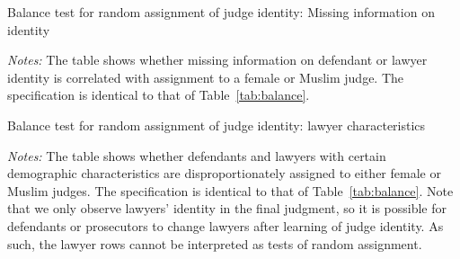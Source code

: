 \documentclass[12pt,english]{article}
\newcommand{\HOME}{\string~}
\newcommand{\curpath}{\HOME/ddl/justice-overleaf}
\newcommand{\curpath}{.}
\begin{document}
\begin{appendices}
\newpage


\begin{table}
   \begin{center}
    \caption{Balance test for random assignment of judge identity: Missing information on identity}
    \label{tab:bal_miss}
    \resizebox{1\linewidth}{!}{
      }
  \end{center}
  \begin{minipage}{\textwidth}
    {\scriptsize \emph{Notes:} The table shows whether missing information on defendant or lawyer identity is correlated with assignment to a female or Muslim judge. The specification is identical to that of Table~\ref{tab:balance}. \par}
  \end{minipage}
\end{table}

\newpage

\begin{table}
  \begin{center}
    \caption{Balance test for random assignment of judge identity: lawyer characteristics}
    \label{tab:bal_lawyer_no_fe}
    \resizebox{1\linewidth}{!}{
      
    }
    
    \begin{minipage}{\textwidth}
      {\scriptsize \emph{Notes:} The table shows whether defendants and lawyers with certain demographic characteristics are disproportionately assigned to either female or Muslim judges. The specification is identical to that of Table~\ref{tab:balance}. Note that we only observe lawyers' identity in the final judgment, so it is possible for defendants or prosecutors to change lawyers after learning of judge identity. As such, the lawyer rows cannot be interpreted as tests of random assignment.  \par}
    \end{minipage}
  \end{center}
\end{table}


\end{appendices}
\end{document}
